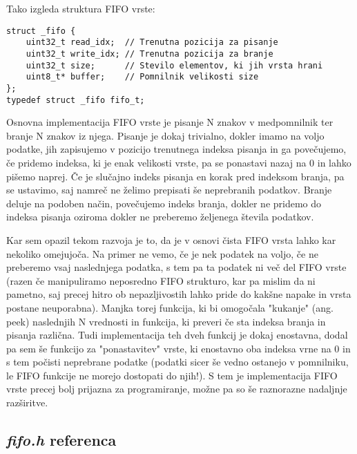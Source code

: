 \documentclass[12pt,a4paper,twoside,openright,slovene]{book}
\begin{document}
Tako izgleda struktura FIFO vrste:
\begin{lstlisting}
struct _fifo {
    uint32_t read_idx;  // Trenutna pozicija za pisanje
    uint32_t write_idx; // Trenutna pozicija za branje
    uint32_t size;      // Stevilo elementov, ki jih vrsta hrani
    uint8_t* buffer;    // Pomnilnik velikosti size
};
typedef struct _fifo fifo_t;
\end{lstlisting}

Osnovna implementacija FIFO vrste je pisanje N znakov v medpomnilnik ter branje N znakov iz njega. Pisanje je dokaj trivialno, dokler imamo na voljo podatke, jih zapisujemo v pozicijo trenutnega indeksa pisanja in ga povečujemo, če pridemo indeksa, ki je enak velikosti vrste, pa se ponastavi nazaj na 0 in lahko pišemo naprej. Če je slučajno indeks pisanja en korak pred indeksom branja, pa se ustavimo, saj namreč ne želimo prepisati še neprebranih podatkov. Branje deluje na podoben način, povečujemo indeks branja, dokler ne pridemo do indeksa pisanja oziroma dokler ne preberemo željenega števila podatkov.

Kar sem opazil tekom razvoja je to, da je v osnovi čista FIFO vrsta lahko kar nekoliko omejujoča. Na primer ne vemo, če je nek podatek na voljo, če ne preberemo vsaj naslednjega podatka, s tem pa ta podatek ni več del FIFO vrste (razen če manipuliramo neposredno FIFO strukturo, kar pa mislim da ni pametno, saj precej hitro ob nepazljivostih lahko pride do kakšne napake in vrsta postane neuporabna). Manjka torej funkcija, ki bi omogočala "kukanje" (ang. peek) naslednjih N vrednosti in funkcija, ki preveri če sta indeksa branja in pisanja različna. Tudi implementacija teh dveh funkcij je dokaj enostavna, dodal pa sem še funkcijo za "ponastavitev" vrste, ki enostavno oba indeksa vrne na 0 in s tem počisti neprebrane podatke (podatki sicer še vedno ostanejo v pomnilniku, le FIFO funkcije ne morejo dostopati do njih!). S tem je implementacija FIFO vrste precej bolj prijazna za programiranje, možne pa so še raznorazne nadaljnje razširitve.



\subsection{\textit{fifo.h} referenca}
\end{document}
